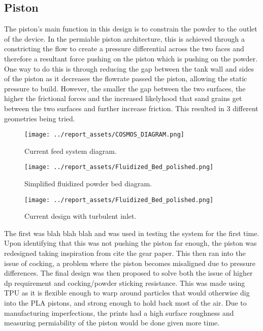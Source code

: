 \subsection{Piston}
The piston's main function in this design is to constrain the powder to the outlet of the device. In the permiable piston architecture, this is achieved through a constricting the flow to create a pressure differential across the two faces and therefore a resultant force pushing on the piston which is pushing on the powder. One way to do this is through reducing the gap between the tank wall and sides of the piston as it decreases the flowrate passed the piston, allowing the static pressure to build. However, the smaller the gap between the two surfaces, the higher the frictional forces and the increased likelyhood that sand grains get between the two surfaces and further increase friction. This resulted in 3 different geometries being tried.
\begin{figure}[htbp]
    \centering

    \begin{minipage}{0.3\textwidth}
        \centering
        \texttt{[image: ../report\_assets/COSMOS\_DIAGRAM.png]}
        \caption{Current feed system diagram.}\label{fig:piston_geom_1}
    \end{minipage}
    \hfill
    \begin{minipage}{0.3\textwidth}
        \centering
        \texttt{[image: ../report\_assets/Fluidized\_Bed\_polished.png]}
        \caption{Simplified fluidized powder bed diagram.}\label{fig:piston_geom_2}
    \end{minipage}
    \hfill
    \begin{minipage}{0.3\textwidth}
        \centering
        \texttt{[image: ../report\_assets/Fluidized\_Bed\_polished.png]}
        \caption{Current design with turbulent inlet.}\label{fig:piston_geom_3}
    \end{minipage}

\end{figure}

The first was blah blah blah and was used in testing the system for the first time.
Upon identifying that this was not pushing the piston far enough, the piston was redesigned taking inspiration from cite the gear paper.
This then ran into the issue of cocking, a problem where the piston becomes misaligned due to pressure differences.
The final design was then proposed to solve both the issue of higher dp requirement and cocking/powder sticking resistance. This was made using TPU as it is flexible enough to warp around particles that would otherwise dig into the PLA pistons, and strong enough to hold back most of the air. Due to manufacturing imperfections, the prints had a high surface roughness and measuring permiability of the piston would be done given more time.
 
